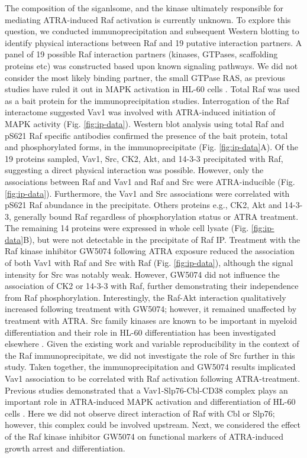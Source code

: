 \documentclass[12pt]{article}
\begin{document}
The composition of the siganlsome, and the kinase ultimately responsible for mediating ATRA-induced Raf activation is currently unknown.
To explore this question, we conducted immunoprecipitation and subsequent Western blotting to identify physical interactions between Raf and 19 putative interaction partners.
A panel of 19 possible Raf interaction partners (kinases, GTPases, scaffolding proteins etc)
was constructed based upon known signaling pathways.
We did not consider the most likely binding partner,
the small GTPase RAS, as previous studies have ruled it out in MAPK activation in HL-60 cells \cite{Wang2008,Katagiri1994}.
Total Raf was used as a bait protein for the immunoprecipitation studies.
Interrogation of the Raf interactome suggested Vav1 was involved with ATRA-induced initiation of MAPK activity (Fig. \ref{fig:ip-data}).
Western blot analysis using total Raf and pS621 Raf specific antibodies confirmed the
presence of the bait protein, total and phosphorylated forms, in the immunoprecipitate (Fig. \ref{fig:ip-data}A).
Of the 19 proteins sampled, Vav1, Src, CK2, Akt, and 14-3-3 precipitated with Raf, suggesting a direct physical interaction was possible.
However, only the associations between Raf and Vav1 and Raf and Src were ATRA-inducible (Fig. \ref{fig:ip-data}).
Furthermore, the Vav1 and Src associations were correlated with pS621 Raf abundance in the precipitate.
Others proteins e.g., CK2, Akt and 14-3-3, generally bound Raf regardless of phosphorylation status or ATRA treatment.
The remaining 14 proteins were expressed in whole cell lysate (Fig. \ref{fig:ip-data}B),
but were not detectable in the precipitate of Raf IP.
Treatment with the Raf kinase inhibitor GW5074 following ATRA exposure reduced the association of both Vav1 with Raf and Src with Raf (Fig. \ref{fig:ip-data}),
although the signal intensity for Src was notably weak.
However, GW5074 did not influence the association of CK2 or 14-3-3 with Raf, further demonstrating their independence from Raf phosphorylation.
Interestingly, the Raf-Akt interaction qualitatively increased following treatment with GW5074;
however, it remained unaffected by treatment with ATRA.
Src family kinases are known to be important in myeloid differentiation \cite{Miranda2007} and their role in HL-60 differentiation has been investigated elsewhere \cite{Congleton:2012fk}.
Given the existing work and variable reproducibility in the context of the Raf immunoprecipitate,
we did not investigate the role of Src further in this study.
Taken together, the immunoprecipitation and GW5074 results implicated Vav1 association to be correlated with Raf activation following ATRA-treatment.
Previous studies demonstrated that a Vav1-Slp76-Cbl-CD38 complex plays an important role in ATRA-induced MAPK activation and differentiation of HL-60 cells \cite{Shen2009}.
Here we did not observe direct interaction of Raf with Cbl or Slp76;
however, this complex could be involved upstream. Next, we considered the effect of the Raf kinase inhibitor GW5074 on functional markers of ATRA-induced growth arrest and differentiation.
\end{document}
